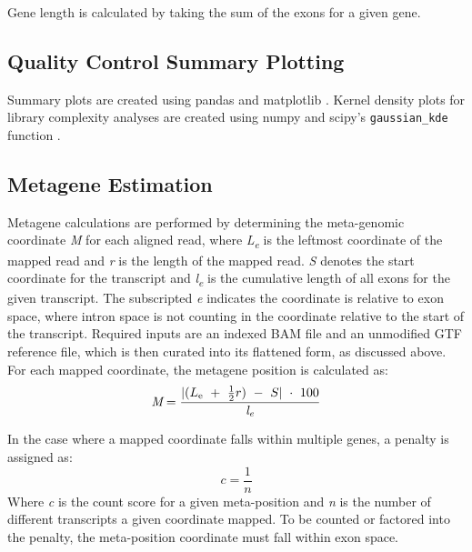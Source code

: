 \documentclass[11pt, a4paper, oneside]{article}
\begin{document}
Gene length is calculated by taking the sum of the exons for a given gene.

\subsection{Quality Control Summary Plotting}
Summary plots are created using pandas \cite{pandas} and matplotlib \cite{matplotlib}. Kernel density plots for library complexity analyses are created using numpy \cite{numpy1, numpy2} and scipy's \texttt{gaussian\_kde} function \cite{scipy}.

\subsection{Metagene Estimation}
Metagene calculations are performed by determining the meta-genomic coordinate \textit{M} for each aligned read, where \textit{L\textsubscript{e}} is the leftmost coordinate of the mapped read and \textit{r} is the length of the mapped read. \textit{S} denotes the start coordinate for the transcript and \textit{l\textsubscript{e}} is the cumulative length of all exons for the given transcript. The subscripted \textit{e} indicates the coordinate is relative to exon space, where intron space is not counting in the coordinate relative to the start of the transcript. Required inputs are an indexed BAM file and an unmodified GTF reference file, which is then curated into its flattened form, as discussed above. For each mapped coordinate, the metagene position is calculated as:
\begin{equation}
\textit{M} = \frac{|(L\textsubscript{e}\ +\ \frac{1}{2}r)\ -\ S|\ \cdot\ 100}{\textit{l\textsubscript{e}}}
\end{equation}

In the case where a mapped coordinate falls within multiple genes, a penalty is assigned as:
\begin{equation}
  \textit{c} = \frac{1}{\textit{n}}
\end{equation}
Where \textit{c} is the count score for a given meta-position and \textit{n} is the number of different transcripts a given coordinate mapped. To be counted or factored into the penalty, the meta-position coordinate must fall within exon space.
\end{document}
